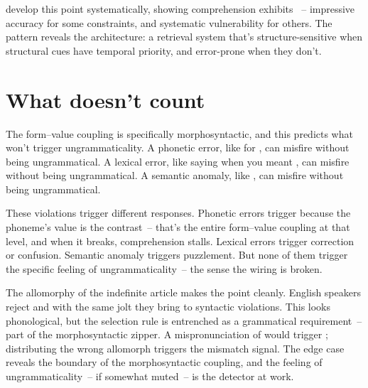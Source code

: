 \textcite{phillips2011grammatical} develop this point systematically, showing comprehension exhibits ~-- impressive accuracy for some constraints, and systematic vulnerability for others. The pattern reveals the architecture: a retrieval system that's structure-sensitive when structural cues have temporal priority, and error-prone when they don't.


\section{What doesn't count}
\label{sec:14:negative-space}

The form--value coupling is specifically morphosyntactic, and this predicts what won't trigger ungrammaticality. A phonetic error, like  for , can misfire without being ungrammatical. A lexical error, like saying  when you meant , can misfire without being ungrammatical. A semantic anomaly, like , can misfire without being ungrammatical.

These violations trigger different responses. Phonetic errors trigger  because the phoneme's value is the contrast~-- that's the entire form--value coupling at that level, and when it breaks, comprehension stalls. Lexical errors trigger correction or confusion. Semantic anomaly triggers puzzlement. But none of them trigger the specific feeling of ungrammaticality~-- the sense the wiring is broken.

The allomorphy of the indefinite article makes the point cleanly. English speakers reject  and  with the same jolt they bring to syntactic violations. This looks phonological, but the selection rule is entrenched as a grammatical requirement~-- part of the morphosyntactic zipper. A mispronunciation of  would trigger ; distributing the wrong allomorph triggers the mismatch signal. The edge case reveals the boundary of the morphosyntactic coupling, and the feeling of ungrammaticality~-- if somewhat muted~-- is the detector at work.

